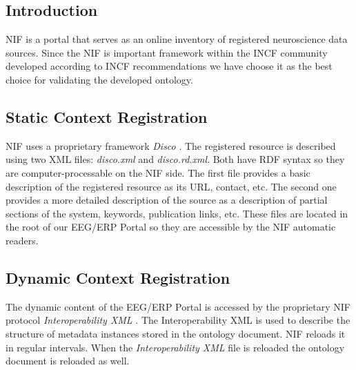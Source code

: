 \documentclass[conference]{IEEEtran}
\begin{document}
\subsection{Introduction}

NIF is a portal that serves as an online inventory of registered neuroscience data sources. Since the NIF is important framework within the INCF community developed according to INCF recommendations \cite{incf-sustainability-report} we have choose it as the best choice for validating the developed ontology.

\subsection{Static Context Registration}

NIF uses a proprietary framework \emph{Disco} \cite{NIF-Neuroinformatics}. The registered resource is described using two XML files: \emph{disco.xml} and \emph{disco.rd.xml}. Both have RDF syntax so they are computer-processable on the NIF side. The first file provides a basic description of the registered resource as its URL, contact, etc. The second one provides a more detailed description of the source as a description of partial sections of the system, keywords, publication links, etc. These files are located in the root of our EEG/ERP Portal so they are accessible by the NIF automatic readers.

\subsection{Dynamic Context Registration}

The dynamic content of the EEG/ERP Portal is accessed by the proprietary NIF protocol \emph{Interoperability XML} \cite{ncbo-bioPortal}. The Interoperability XML is used to describe the structure of metadata instances stored in the ontology document. NIF reloads it in regular intervals. When the \emph{Interoperability XML} file is reloaded the ontology document is reloaded as well.

%
%
\end{document}
